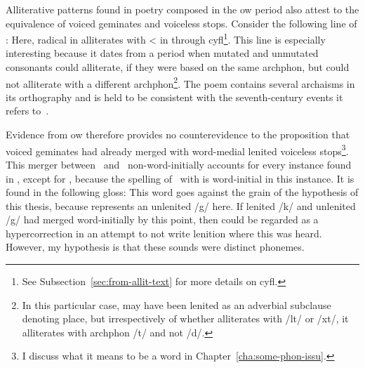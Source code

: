 Alliterative patterns found in poetry composed in the \gls{ow} period also attest to the equivalence of voiced geminates and voiceless stops. Consider the following line of :
Here, radical  in  alliterates with  <  in  through \gls{cyfl}\footnote{See Subsection~\ref{sec:from-allit-text} for more details on \gls{cyfl}.}. This line is especially interesting because it dates from a period when mutated and unmutated consonants could alliterate, if they were based on the same \gls{archphon}, but could not alliterate with a different \gls{archphon}\footnote{In this particular case,  may have been lenited as an adverbial subclause denoting place, but irrespectively of whether  alliterates with /\gls{l}t/ or /\gls{x}t/, it alliterates with \gls{archphon} /t/ and not /d/.}. The poem contains several archaisms in its orthography and is held to be consistent with the seventh-century events it refers to~\autocite[186--187]{koch_cunedda_2013}.

Evidence from \gls{ow} therefore provides no counterevidence to the proposition that voiced geminates had already merged with word-medial lenited voiceless stops\footnote{I discuss what it means to be a word in Chapter~\ref{cha:some-phon-issu}.}. 
This merger between \lT\ and \xD\ non-word-initially accounts for every instance found in , except for , because the spelling of \xD\ with  is word-initial in this instance. It is found in the following gloss:
This word goes against the grain of the hypothesis of this thesis, because  represents an unlenited /g/ here. If lenited /k/ and unlenited /g/ had merged word-initially by this point, then  could be regarded as a hypercorrection in an attempt to not write lenition where this was heard. However, my hypothesis is that these sounds were distinct phonemes. 

